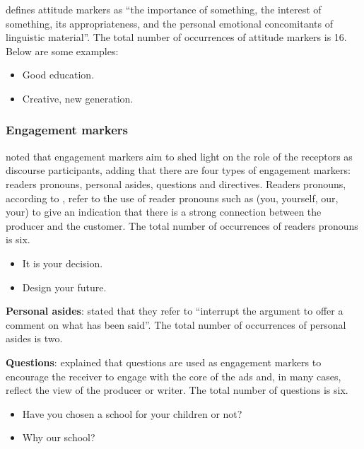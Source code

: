 \documentclass[english]{textolivre}
\begin{document}
\textcite[p.~174]{adel_metadiscourse_2008} defines attitude markers as “the importance of something, the interest of something, its appropriateness, and the personal emotional concomitants of linguistic material”. The total number of occurrences of attitude markers is 16. Below are some examples:

\begin{itemize}
    \item Good education.
    \item Creative, new generation.
\end{itemize}

\subsubsection{Engagement markers}
\textcite{hyland_metadiscourse:_2005} noted that engagement markers aim to shed light on the role of the receptors as discourse participants, adding that there are four types of engagement markers: readers pronouns, personal asides, questions and directives. Readers pronouns, according to \textcite{hyland_metadiscourse:_2005}, refer to the use of reader pronouns such as (you, yourself, our, your) to give an indication that there is a strong connection between the producer and the customer. The total number of occurrences of readers pronouns is six.

\begin{itemize}
    \item It is your decision.
    \item Design your future.
\end{itemize}

\textbf{Personal asides}: \textcite[p.~28]{al-subhi_metadiscourse_2022} stated that they refer to “interrupt the argument to offer a comment on what has been said”. The total number of occurrences of personal asides is two.

\textbf{Questions}: \textcite{hyland_metadiscourse:_2005} explained that questions are used as engagement markers to encourage the receiver to engage with the core of the ads and, in many cases, reflect the view of the producer or writer. The total number of questions is six. 

\begin{itemize}
    \item Have you chosen a school for your children or not?
    \item Why our school?
\end{itemize}
\end{document}
